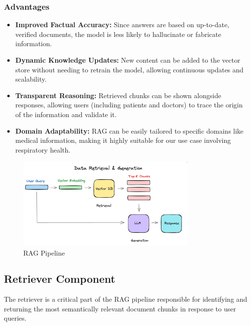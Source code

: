 \subsubsection*{Advantages}
\begin{itemize}
    \item \textbf{Improved Factual Accuracy:} Since answers are based on up-to-date, verified documents, the model is less likely to hallucinate or fabricate information.
    
    \item \textbf{Dynamic Knowledge Updates:} New content can be added to the vector store without needing to retrain the model, allowing continuous updates and scalability.
    
    \item \textbf{Transparent Reasoning:} Retrieved chunks can be shown alongside responses, allowing users (including patients and doctors) to trace the origin of the information and validate it.
    
    \item \textbf{Domain Adaptability:} RAG can be easily tailored to specific domains like medical information, making it highly suitable for our use case involving respiratory health.
\end{itemize}

\begin{figure}[htbp]
  \centering
  \includegraphics[width=0.8\textwidth]{images/Data_retrieval_and_generation_RAG.png}
  \caption{RAG Pipeline} %
  \label{fig:retrieval_figure}
\end{figure}

\subsection{Retriever Component}
\label{subsec:retriever}

The retriever is a critical part of the RAG pipeline responsible for identifying and returning the most semantically relevant document chunks in response to user queries.

